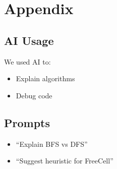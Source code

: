 \documentclass[12pt,a4paper]{article}
\begin{document}
\section{Appendix}

\subsection{AI Usage}
We used AI to:
\begin{itemize}
    \item Explain algorithms
    \item Debug code
\end{itemize}

\subsection{Prompts}
\begin{itemize}
    \item ``Explain BFS vs DFS''
    \item ``Suggest heuristic for FreeCell''
\end{itemize}
\end{document}
